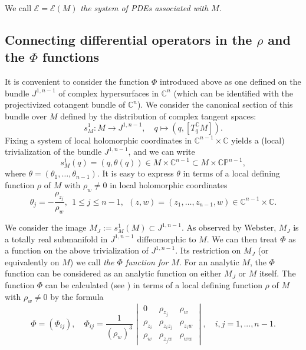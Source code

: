 \documentclass[12pt]{amsart}
\def\CC{\mathbb{C}}
\def\beq{\begin{equation}}
\def\eeq{\end{equation}}
\def\th{\theta}
\begin{document}
 We call $\mathcal E = \mathcal{E}(M)$  \it the system of PDEs 
 associated with $M$. \rm  


\subsection{Connecting differential operators in the $\rho$ and the $\Phi$ functions} 

It is convenient to consider the function $\Phi$ introduced above as one defined on the bundle $J^{1,n-1}$ of complex hypersurfaces in $\CC^{n}$ (which can be identified with the projectivized cotangent bundle of $\CC^n$). We consider the canonical section of this bundle over $M$
defined by the distribution of complex tangent spaces:
\beq
\label{th-section}
s_M^1\colon M\to J^{1,n-1}, 
\quad
q\mapsto (q, [T^\CC_q M]).
\eeq
Fixing a system of local holomorphic  coordinates
in $\CC^{n-1}\times\CC{}$ yields a (local) trivialization of the bundle $J^{1,n-1}$, and we can write
\beq
\label{th-def}
s_M^1(q) = (q, \th(q))
\in M\times \CC^{n-1} \subset M\times \CC \mathbb P^{n-1},
\eeq
where $\th=(\th_1,\ldots,\th_{n-1})$.
It is easy to express $\th$
in terms of a local defining function $\rho$ of $M$
with $\rho_w\ne 0$
in local holomorphic coordinates
\beq
\label{th-coor}
\th_j = -\frac{\rho_{z_j}}{\rho_w}, 
\ \  1\le j\le n-1,
\ \ 
(z,w)=(z_1,\ldots,z_{n-1},w)\in \CC^{n-1}\times \CC{}.
\eeq

We consider the image $M_J:=s^1_M(M)\subset J^{1,n-1}$. As observed by Webster, $M_J$ is a totally real submanifold in $J^{1,n-1}$ diffeomorphic to $M$. We can then treat $\Phi$ as a function on the above trivialization of $J^{1,n-1}$. Its restriction on $M_J$ (or equivalently on $M$) we call {\it the $\Phi$ function for $M$}. For an analytic $M$, the $\Phi$ function can be considered as an analytic function on either $M_J$ or $M$ itself. The function $\Phi$ can be calculated (see \cite{KZ1,KZ2})
in terms of a local defining function $\rho$ of $M$
with $\rho_w\ne 0$
by the formula
\begin{equation}\label{Phi00}
\Phi = (\Phi_{ij}),
\quad
	\Phi_{ij}=\frac{1}{(\rho_w)^3}
\begin{vmatrix} 0 & \rho_{z_j} & \rho_w\\ \rho_{z_i} & \rho_{z_iz_j} & \rho_{z_iw} \\ \rho_w & \rho_{z_jw} & \rho_{ww} \end{vmatrix},
 \quad i,j=1,...,n-1.
\end{equation}
\end{document}
